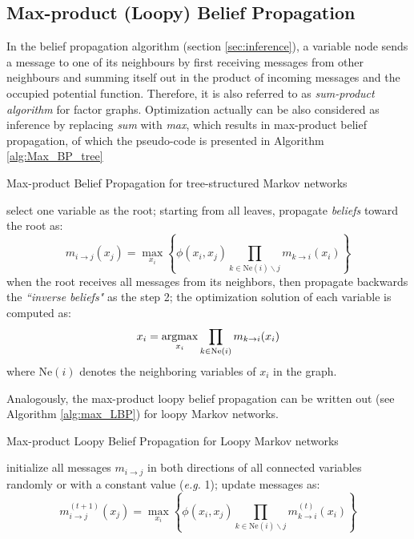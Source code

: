 \subsection{Max-product (Loopy) Belief Propagation}
In the belief propagation algorithm (section \ref{sec:inference}), a variable node sends a message to one of its neighbours by first
receiving messages from other neighbours and summing itself out in the product of incoming messages and the occupied potential function.  
Therefore, it is also referred to as \emph{sum-product algorithm} for factor graphs. Optimization actually can be also considered as     
inference by replacing \emph{sum} with \emph{max}, which results in max-product belief propagation, of which the pseudo-code is presented 
in Algorithm \ref{alg:Max_BP_tree}
 \begin{algorithm}
	\caption{Max-product Belief Propagation for tree-structured Markov networks}
	\label{alg:Max_BP_tree}
\begin{algorithmic}[1]
\STATE  select one variable as the root; 
\STATE  starting from all leaves, propagate \emph{beliefs} toward the root as:
\begin{equation*}
m_{i \rightarrow j}(x_j)= \max_{x_i}\left\{\phi(x_i,x_j) \prod_{k\in \text{Ne}(i)\backslash j} m_{k \rightarrow i}(x_i)\right\}
\end{equation*}
\STATE  when the root receives all messages from its neighbors, then propagate backwards the \emph{``inverse beliefs"} as the step 2;
\STATE  the optimization solution of each variable is computed as: 
\begin{equation*}
	x_i=\mathop\mathrm{argmax}_{x_i} \prod_{k\in \text{Ne}(i)} m_{k \rightarrow i}(x_i)
\end{equation*}
where Ne$(i)$ denotes the neighboring variables of $x_i$ in the graph. 
\end{algorithmic}
\end{algorithm}

Analogously, the max-product loopy belief propagation can be written out (see Algorithm \ref{alg:max_LBP}) for loopy Markov networks.  
\begin{algorithm}
	\caption{Max-product Loopy Belief Propagation for Loopy Markov networks}
	\label{alg:max_LBP}
\begin{algorithmic}[1]
\STATE  initialize all messages $m_{i\rightarrow j}$ in both directions of all connected variables randomly or with a constant value (\emph{e.g.} 1);
\STATE  update messages as:
\begin{equation*}
  m^{(t+1)}_{i \rightarrow j}(x_j)= \max_{x_i}\left\{\phi(x_i,x_j) \prod_{k\in \text{Ne}(i)\backslash j} m^{(t)}_{k \rightarrow i}(x_i)\right\}
\end{equation*}
\ENDWHILE
\end{algorithmic}
\end{algorithm}



